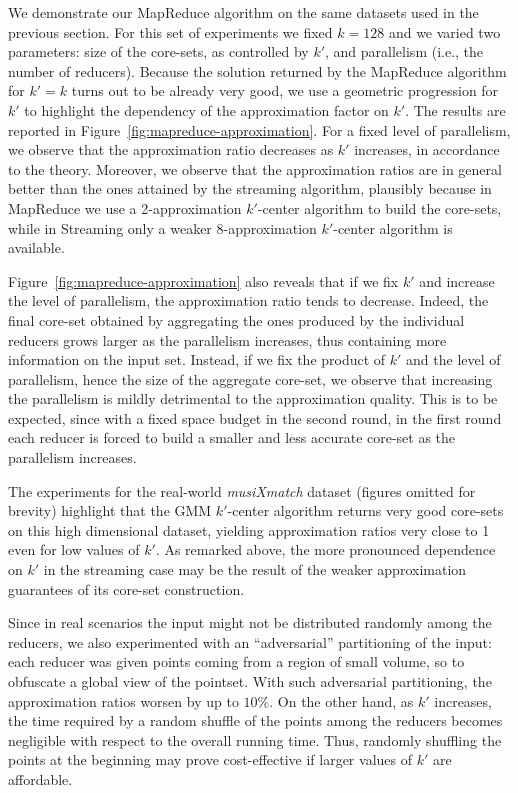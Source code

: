 \documentclass{article}
\begin{document}
We demonstrate our MapReduce algorithm on the same datasets used in
the previous section. For this set of experiments we fixed $k=128$ and
we varied two parameters: size of the core-sets, as controlled by
$k'$, and parallelism (i.e., the number of reducers).  Because the
solution returned by the MapReduce algorithm for $k'=k$ turns out to
be already very good, we use a geometric progression for $k'$ to
highlight the dependency of the approximation factor on $k'$.  The
results are reported in Figure~\ref{fig:mapreduce-approximation}.  For
a fixed level of parallelism, we observe that the approximation ratio
decreases as $k'$ increases, in accordance to the theory.  Moreover,
we observe that the approximation ratios are in general better than
the ones attained by the streaming algorithm, plausibly because in
MapReduce we use a 2-approximation $k'$-center algorithm to build the
core-sets, while in Streaming only a weaker 8-approximation
$k'$-center algorithm is available.

Figure~\ref{fig:mapreduce-approximation} also reveals that if we fix
$k'$ and increase the level of parallelism, the approximation ratio
tends to decrease.  Indeed, the final core-set obtained by aggregating
the ones produced by the individual reducers grows larger as the
parallelism increases, thus containing more information on the input
set.  Instead, if we fix the product of $k'$ and the level of
parallelism, hence the size of the aggregate core-set, we observe that
increasing the parallelism is mildly detrimental to the approximation
quality.  This is to be expected, since with a fixed space budget in
the second round, in the first round each reducer is forced to build a
smaller and less accurate core-set as the parallelism increases.

The experiments for the real-world \emph{musiXmatch} dataset (figures
omitted for brevity) highlight that the {\sc GMM} $k'$-center
algorithm returns very good core-sets on this high dimensional
dataset, yielding approximation ratios very close to 1 even for low
values of $k'$. As remarked above, the more pronounced dependence on
$k'$ in the streaming case may be the result of the weaker approximation
guarantees of its core-set construction.


Since in real scenarios the input might not be distributed randomly
among the reducers, we also experimented with an ``adversarial''
partitioning of the input: each reducer was given points coming from a
region of small volume, so to obfuscate a global view of the
pointset. With such adversarial partitioning, the approximation ratios
worsen by up to $10\%$. On the other hand, as $k'$ increases, the
time required by a random shuffle of the points among the reducers
becomes negligible with respect to the overall running time. Thus,
randomly shuffling the points at the beginning may prove
cost-effective if larger values of $k'$ are affordable.
\end{document}
